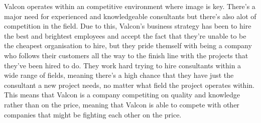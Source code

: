Valcon operates within an competitive environment where image is key. There's a major need for experienced and knowledgeable consultants but there's also alot of competition in the field.
Due to this, Valcon's business strategy has been to hire the best and brightest employees and accept the fact that they're unable to be the cheapest organisation to hire, but they pride themself with being a company who follows their customers all the way to the finish line with the projects that they've been hired to do. 
They work hard trying to hire consultants within a wide range of fields, meaning there's a high chance that they have just the consultant a new project needs, no matter what field the project operates within. 
This means that Valcon is a company competiting on quality and knowledge rather than on the price, meaning that Valcon is able to compete with other companies that might be fighting each other on the price.